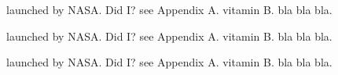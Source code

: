launched by NASA. Did I? see Appendix A. vitamin B. bla bla bla.

launched by {NASA}. Did {I}? see Appendix {A}. vitamin {B}. bla bla bla.

launched by \hbox{NASA}. Did I\null? see Appendix {A}. vitamin {B}. bla bla bla.

\bye


